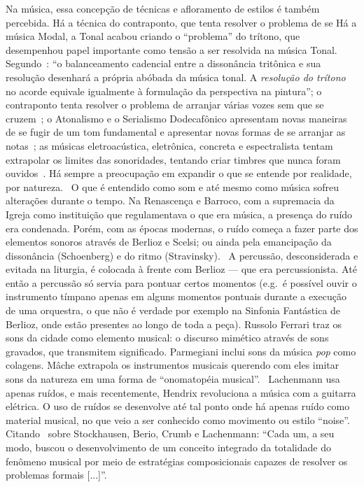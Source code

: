 Na música, essa concepção de técnicas e afloramento de estilos é
também percebida. Há a técnica do contraponto, que tenta resolver o problema de se Há a música Modal, a Tonal  acabou criando o ``problema'' do
trítono, que desempenhou papel importante como tensão a ser resolvida
na música Tonal. Segundo~\citeauthor{wisnik}: ``o balanceamento
cadencial entre a dissonância tritônica e sua resolução desenhará a
própria abóbada da música tonal. A \textit{resolução do trítono} no
acorde equivale igualmente à formulação da perspectiva na pintura''; o
contraponto tenta resolver o problema de arranjar várias vozes sem que
se cruzem~\cite{fux}; o Atonalismo e o Serialismo Dodecafônico
apresentam novas maneiras de se fugir de um tom fundamental e
apresentar novas formas de se arranjar as notas~\cite{webern}; as
músicas eletroacústica, eletrônica, concreta e espectralista tentam
extrapolar os limites das sonoridades, tentando criar timbres que
nunca foram ouvidos~\cite{stockhausen}. Há sempre a preocupação em
expandir o que se entende por realidade, por
natureza.~\cite{wisnik,webern} O que é entendido como som e até mesmo
como música sofreu alterações durante o tempo. Na Renascença e
Barroco, com a supremacia da Igreja como instituição que regulamentava
o que era música, a presença do ruído era condenada. Porém, com as
épocas modernas, o ruído começa a fazer parte dos elementos sonoros
através de Berlioz e Scelsi; ou ainda pela emancipação da dissonância
(Schoenberg) e do ritmo (Stravinsky).~\cite{wisnik,schoenberg} A
percussão, desconsiderada e evitada na liturgia, é colocada à frente
com Berlioz --- que era percussionista. Até então a percussão só
servia para pontuar certos momentos (e.g.\ é possível ouvir o
instrumento tímpano apenas em alguns momentos pontuais durante a
execução de uma orquestra, o que não é verdade por exemplo na Sinfonia
Fantástica de Berlioz, onde estão presentes ao longo de toda a peça).
Russolo Ferrari traz os sons da cidade como elemento musical: o
discurso mimético através de sons gravados, que transmitem
significado. Parmegiani inclui sons da música \textit{pop} como
colagens. Mâche extrapola os instrumentos musicais querendo com eles
imitar sons da natureza em uma forma de ``onomatopéia
musical''.~\cite{casteloes} Lachenmann usa apenas ruídos, e mais
recentemente, Hendrix revoluciona a música com a guitarra elétrica. O
uso de ruídos se desenvolve até tal ponto onde há apenas ruído como
material musical, no que veio a ser conhecido como movimento ou estilo
``noise''.~\cite{russolo} Citando~\citeauthor{guigue} sobre
Stockhausen, Berio, Crumb e Lachenmann: ``Cada um, a seu modo, buscou
o desenvolvimento de um conceito integrado da totalidade do fenômeno
musical por meio de estratégias composicionais capazes de resolver os
problemas formais [...]''.

